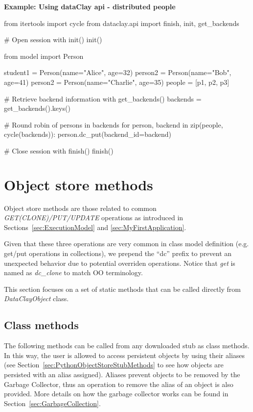 \begin{tBox}
\textcolor{basecolor} {\bf Example: Using dataClay api - distributed people}
\begin{python}
from itertools import cycle
from dataclay.api import finish, init, get_backends

# Open session with init()
init()

from model import Person

student1 = Person(name="Alice", age=32)
person2 = Person(name="Bob", age=41)
person2 = Person(name="Charlie", age=35)
people = [p1, p2, p3]

# Retrieve backend information with get_backends()
backends = get_backends().keys()

# Round robin of persons in backends
for person, backend in zip(people, cycle(backends)):
    person.dc_put(backend_id=backend)

# Close session with finish()
finish()
\end{python}
\end{tBox}


\section{Object store methods}
\label{sec:PythonObjectStore}

Object store methods are those related to common \textit{GET(CLONE)/PUT/UPDATE} operations as introduced in Sections~\ref{sec:ExecutionModel} and \ref{sec:MyFirstApplication}.

Given that these three operations are very common in class model definition (e.g. get/put operations in collections), we prepend the ``dc'' prefix to prevent an unexpected behavior due to potential overriden operations. Notice that \textit{get} is named as \textit{dc\_clone} to match OO terminology.

This section focuses on a set of static methods that can be called directly from \textit{DataClayObject} class.



\subsection{Class methods}
\label{sec:PythonClassMethodsObjectStore}

The following methods can be called from any downloaded stub as class methods. In this way, the user is allowed to access persistent objects by using their aliases (see Section~\ref{sec:PythonObjectStoreStubMethods} to see how objects are persisted with an alias assigned). Aliases prevent objects to be removed by the Garbage Collector, thus an operation to remove the alias of an object is also provided. More details on how the garbage collector works can be found in Section~\ref{sec:GarbageCollection}. 

